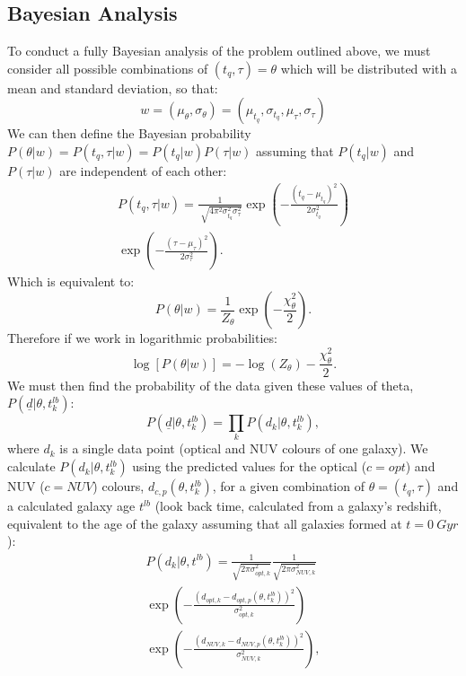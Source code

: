 \documentclass{mn2e}
\begin{document}
\subsection{Bayesian Analysis}
To conduct a fully Bayesian analysis of the problem outlined above, we must consider all possible combinations of $(t_{q}, \tau) = \theta$ which will be distributed with a mean and standard deviation, so that:
\begin{equation*}
w = (\mu_{\theta}, \sigma_{\theta}) = (\mu_{t_{q}}, \sigma_{t_{q}}, \mu_{\tau}, \sigma_{\tau})
\end{equation*}
We can then define the Bayesian probability $P(\theta|w) = P(t_{q}, \tau|w) = P(t_{q}|w)P(\tau|w)$ assuming that $ P(t_{q}|w)$ and $P(\tau|w)$ are independent of each other:
\begin{multline*}
P(t_{q}, \tau|w) = \frac{1}{\sqrt[]{4\pi^2\sigma^2_{t_{q}}\sigma^2_{\tau}}} \exp\left(-\frac{(t_{q}-\mu_{t_{q}})^2}{2\sigma^2_{t_{q}}}\right) \\ \exp\left(-\frac{(\tau-\mu_{\tau})^2}{2\sigma^2_{\tau}}\right).
\end{multline*}
Which is equivalent to:
\begin{equation*}
P(\theta|w) = \frac{1}{Z_{\theta}} \exp\left(-\frac{\chi_{\theta}^2}{2}\right).
\end{equation*}
Therefore if we work in logarithmic probabilities:
\begin{equation*}
\log[P(\theta|w)] = - \log(Z_{\theta}) - \frac{\chi_{\theta}^2}{2}.
\end{equation*}
We must then find the probability of the data given these values of theta, $P(\underline{d}|\theta, t_{k}^{lb})$:
\begin{equation*}
P(\underline{d}|\theta, t_{k}^{lb}) = \prod_{k} P(d_{k}|\theta, t_{k}^{lb}),
\end{equation*}
where $d_{k}$ is a single data point (optical and NUV colours of one galaxy). We calculate $P(d_{k}|\theta, t_{k}^{lb})$ using the predicted values for the optical ($c=opt$) and NUV ($c=NUV$) colours, $d_{c,p}(\theta, t_{k}^{lb})$, for a given combination of $\theta = (t_{q}, \tau)$ and a calculated galaxy age $t^{lb}$ (look back time, calculated from a galaxy's redshift, equivalent to the age of the galaxy assuming that all galaxies formed at $t=0~Gyr$):
\begin{multline*}
P(d_{k}|\theta, t^{lb}) = \frac{1}{\sqrt{2\pi\sigma_{opt, k}^2}}\frac{1}{\sqrt{2\pi\sigma_{NUV, k}^2}} \\ \exp{\left( - \frac{(d_{opt, k} - d_{opt, p}(\theta, t_{k}^{lb}))^2}{\sigma_{opt, k}^2} \right)} \\ \exp{\left( - \frac{(d_{NUV, k} - d_{NUV, p}(\theta, t_{k}^{lb}))^2}{\sigma_{NUV, k}^2} \right)},
\end{multline*}
\end{document}

